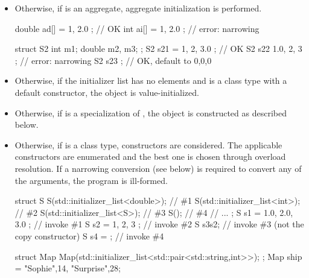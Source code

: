 \begin{itemize}
\item Otherwise, if  is an aggregate, aggregate initialization is
performed.

\begin{example}
\begin{codeblock}
double ad[] = { 1, 2.0 };           // OK
int ai[] = { 1, 2.0 };              // error: narrowing

struct S2 {
  int m1;
  double m2, m3;
};
S2 s21 = { 1, 2, 3.0 };             // OK
S2 s22 { 1.0, 2, 3 };               // error: narrowing
S2 s23 { };                         // OK, default to 0,0,0
\end{codeblock}
\end{example}

\item Otherwise, if the initializer list has no elements and  is a class type with a
default constructor, the object is value-initialized.

\item Otherwise, if  is a specialization of ,
the object is constructed as described below.

\item Otherwise, if  is a class type, constructors are considered.
The applicable constructors are enumerated and
the best one is chosen through overload resolution. If a narrowing
conversion (see below) is required to convert any of the arguments, the program is
ill-formed.

\begin{example}
\begin{codeblock}
struct S {
  S(std::initializer_list<double>); // \#1
  S(std::initializer_list<int>);    // \#2
  S(std::initializer_list<S>);      // \#3
  S();                              // \#4
  // ...
};
S s1 = { 1.0, 2.0, 3.0 };           // invoke \#1
S s2 = { 1, 2, 3 };                 // invoke \#2
S s3{s2};                           // invoke \#3 (not the copy constructor)
S s4 = { };                         // invoke \#4
\end{codeblock}
\end{example}

\begin{example}
\begin{codeblock}
struct Map {
  Map(std::initializer_list<std::pair<std::string,int>>);
};
Map ship = {{"Sophie",14}, {"Surprise",28}};
\end{codeblock}
\end{example}


\end{itemize}
